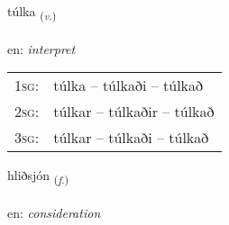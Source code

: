 \documentclass[frontgrid, backgrid]{flacards}\usepackage[]{graphicx}\usepackage[]{color}
\begin{document}
\renewcommand{\flhead}{\vskip5pt \fboxsep=0pt {\small\bfseries\footnotesize Sagnorð | Verb}}
\renewcommand{\fcfoot}{\vskip5pt \fboxsep=0pt \hspace{2pt}{\small\bfseries\footnotesize 2K}}

\renewcommand{\blhead}{\vskip5pt {\small\bfseries\footnotesize Sagnorð | Verb }}
\renewcommand{\bcfoot}{\vskip5pt \hspace{2pt}{\small\bfseries\footnotesize 2K}}


{túlka \small{\textsubscript{(\textit{v.})}} \\[1ex] %
\textphonetic{[tʰul̥ka]} \\
en: \emph{interpret} \\  [2ex]
\renewcommand*{\arraystretch}{0.8}
\begin{tabular}{p{1cm}l}
\textsc{1sg}: & túlka -- túlkaði -- túlkað \\ 
\textsc{2sg}: & túlkar -- túlkaðir -- túlkað \\ 
\textsc{3sg}: & túlkar -- túlkaði -- túlkað \\ 
\end{tabular}
}

\renewcommand{\flhead}{\vskip5pt \fboxsep=0pt {\small\bfseries\footnotesize Nafnorð | Noun}}
\renewcommand{\fcfoot}{\vskip5pt \fboxsep=0pt \hspace{2pt}{\small\bfseries\footnotesize 2K}}

\renewcommand{\blhead}{\vskip5pt {\small\bfseries\footnotesize Nafnorð | Noun }}
\renewcommand{\bcfoot}{\vskip5pt \hspace{2pt}{\small\bfseries\footnotesize 2K}}


{hliðsjón \small{\textsubscript{(\textit{f.})}} \\[1ex] %
\textphonetic{[l̥ɪðsjoun]} \\
en: \emph{consideration} \\  [2ex]
\renewcommand*{\arraystretch}{0.8}
}
\end{document}
